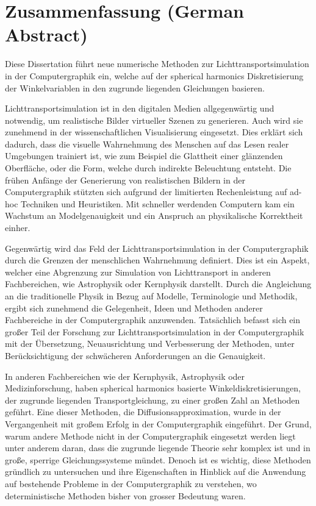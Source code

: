 %
\chapter*{Zusammenfassung (German Abstract)}
%
%
Diese Dissertation führt neue numerische Methoden zur Lichttransportsimulation in der Computergraphik ein, welche auf der spherical harmonics Diskretisierung der Winkelvariablen in den zugrunde liegenden Gleichungen basieren.

Lichttransportsimulation ist in den digitalen Medien allgegenwärtig und notwendig, um realistische Bilder virtueller Szenen zu generieren. Auch wird sie zunehmend in der wissenschaftlichen Visualisierung eingesetzt. Dies erklärt sich dadurch, dass die visuelle Wahrnehmung des Menschen auf das Lesen realer Umgebungen trainiert ist, wie zum Beispiel die Glattheit einer glänzenden Oberfläche, oder die Form, welche durch indirekte Beleuchtung entsteht. Die frühen Anfänge der Generierung von realistischen Bildern in der Computergraphik stützten sich aufgrund der limitierten Rechenleistung auf ad-hoc Techniken und Heuristiken. Mit schneller werdenden Computern kam ein Wachstum an Modelgenauigkeit und ein Anspruch an physikalische Korrektheit einher.

Gegenwärtig wird das Feld der Lichttransportsimulation in der Computergraphik durch die Grenzen der menschlichen Wahrnehmung definiert. Dies ist ein Aspekt, welcher eine Abgrenzung zur Simulation von Lichttransport in anderen Fachbereichen, wie Astrophysik oder Kernphysik darstellt. Durch die Angleichung an die traditionelle Physik in Bezug auf Modelle, Terminologie und Methodik, ergibt sich zunehmend die Gelegenheit, Ideen und Methoden anderer Fachbereiche in der Computergraphik anzuwenden. Tatsächlich befasst sich ein großer Teil der Forschung zur Lichttransportsimulation in der Computergraphik mit der Übersetzung, Neuausrichtung und Verbesserung der Methoden, unter Berücksichtigung der schwächeren Anforderungen an die Genauigkeit.

In anderen Fachbereichen wie der Kernphysik, Astrophysik oder Medizinforschung, haben spherical harmonics basierte Winkeldiskretisierungen, der zugrunde liegenden Transportgleichung, zu einer großen Zahl an Methoden geführt. Eine dieser Methoden, die Diffusionsapproximation, wurde in der Vergangenheit mit großem Erfolg in der Computergraphik eingeführt. Der Grund, warum andere Methode nicht in der Computergraphik eingesetzt werden liegt unter anderem daran, dass die zugrunde liegende Theorie sehr komplex ist und in große, sperrige Gleichungssysteme mündet. Denoch ist es wichtig, diese Methoden gründlich zu untersuchen und ihre Eigenschaften in Hinblick auf die Anwendung auf bestehende Probleme in der Computergraphik zu verstehen, wo deterministische Methoden bisher von grosser Bedeutung waren.

